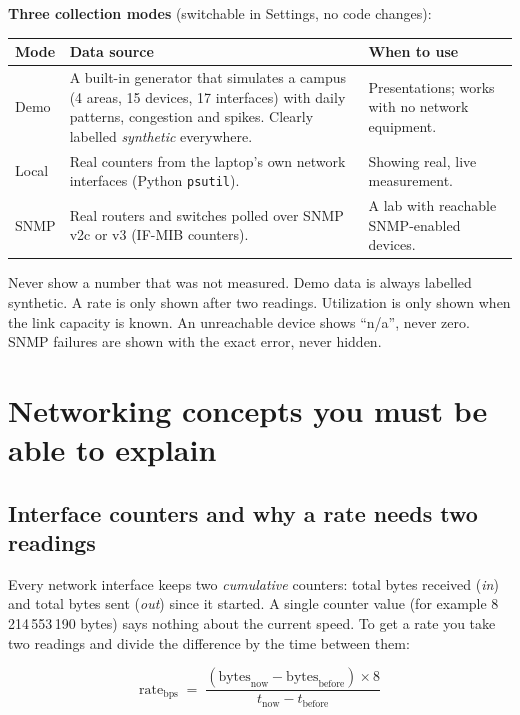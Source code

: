 \documentclass[11pt,a4paper]{article}
\newcommand{\code}[1]{\texttt{#1}}
\begin{document}
\textbf{Three collection modes} (switchable in Settings, no code changes):
\begin{center}
\begin{tabularx}{\linewidth}{@{}l Y Y@{}}
\toprule
\textbf{Mode} & \textbf{Data source} & \textbf{When to use} \\
\midrule
Demo  & A built-in generator that simulates a campus (4 areas, 15 devices, 17 interfaces) with daily patterns, congestion and spikes.
        Clearly labelled \emph{synthetic} everywhere. & Presentations; works with no network equipment. \\
Local & Real counters from the laptop's own network interfaces (Python \code{psutil}). & Showing real, live measurement. \\
SNMP  & Real routers and switches polled over SNMP v2c or v3 (IF-MIB counters). & A lab with reachable SNMP-enabled devices. \\
\bottomrule
\end{tabularx}
\end{center}

\begin{keyidea}
Never show a number that was not measured. Demo data is always labelled synthetic. A rate is only shown after two readings.
Utilization is only shown when the link capacity is known. An unreachable device shows ``n/a'', never zero. SNMP failures are
shown with the exact error, never hidden.
\end{keyidea}

\section{Networking concepts you must be able to explain}

\subsection{Interface counters and why a rate needs two readings}

Every network interface keeps two \emph{cumulative} counters: total bytes received (\emph{in}) and total bytes sent (\emph{out})
since it started. A single counter value (for example 8\,214\,553\,190 bytes) says nothing about the current speed. To get a
rate you take two readings and divide the difference by the time between them:

\[
\text{rate}_{\text{bps}} \;=\; \frac{(\text{bytes}_{\text{now}} - \text{bytes}_{\text{before}}) \times 8}{t_{\text{now}} - t_{\text{before}}}
\]
\end{document}
